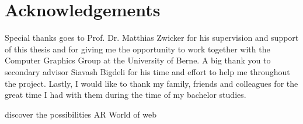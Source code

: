\chapter*{Acknowledgements}

Special thanks goes to Prof. Dr. Matthias Zwicker for his supervision and support of this thesis and for giving me the opportunity to work together with the Computer Graphics Group at the University of Berne.
A big thank you to secondary advisor Siavash Bigdeli for his time and effort to help me throughout the project.
Lastly, I would like to thank my family, friends and colleagues for the great time I had with them during the time of my bachelor studies.


discover the possibilities AR
World of web
